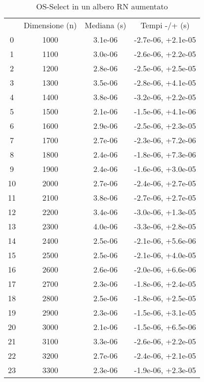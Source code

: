 \begin{table}
\centering
\caption{OS-Select in un albero RN aumentato}
\label{OS-Select in un albero RN aumentato}
\begin{adjustbox}{width=1\textwidth/2}
\begin{tabular}{|c|c|c|c|}
\hline
 & Dimensione (n) & Mediana (s) & Tempi -/+ (s) \\
0 & 1000 & 3.1e-06 & -2.7e-06, +2.1e-05 \\
\cline{1-4}
1 & 1100 & 3.0e-06 & -2.6e-06, +2.2e-05 \\
\cline{1-4}
2 & 1200 & 2.8e-06 & -2.5e-06, +2.5e-05 \\
\cline{1-4}
3 & 1300 & 3.5e-06 & -2.8e-06, +4.1e-05 \\
\cline{1-4}
4 & 1400 & 3.8e-06 & -3.2e-06, +2.2e-05 \\
\cline{1-4}
5 & 1500 & 2.1e-06 & -1.5e-06, +4.1e-06 \\
\cline{1-4}
6 & 1600 & 2.9e-06 & -2.5e-06, +2.3e-05 \\
\cline{1-4}
7 & 1700 & 2.7e-06 & -2.3e-06, +7.2e-06 \\
\cline{1-4}
8 & 1800 & 2.4e-06 & -1.8e-06, +7.3e-06 \\
\cline{1-4}
9 & 1900 & 2.4e-06 & -1.6e-06, +3.0e-05 \\
\cline{1-4}
10 & 2000 & 2.7e-06 & -2.4e-06, +2.7e-05 \\
\cline{1-4}
11 & 2100 & 3.8e-06 & -2.7e-06, +2.7e-05 \\
\cline{1-4}
12 & 2200 & 3.4e-06 & -3.0e-06, +1.3e-05 \\
\cline{1-4}
13 & 2300 & 4.0e-06 & -3.3e-06, +2.8e-05 \\
\cline{1-4}
14 & 2400 & 2.5e-06 & -2.1e-06, +5.6e-06 \\
\cline{1-4}
15 & 2500 & 2.5e-06 & -2.1e-06, +4.0e-05 \\
\cline{1-4}
16 & 2600 & 2.6e-06 & -2.0e-06, +6.6e-06 \\
\cline{1-4}
17 & 2700 & 2.3e-06 & -1.8e-06, +2.4e-05 \\
\cline{1-4}
18 & 2800 & 2.5e-06 & -1.8e-06, +2.5e-05 \\
\cline{1-4}
19 & 2900 & 2.3e-06 & -1.5e-06, +3.1e-05 \\
\cline{1-4}
20 & 3000 & 2.1e-06 & -1.5e-06, +6.5e-06 \\
\cline{1-4}
21 & 3100 & 3.3e-06 & -2.6e-06, +2.2e-05 \\
\cline{1-4}
22 & 3200 & 2.7e-06 & -2.4e-06, +2.1e-05 \\
\cline{1-4}
23 & 3300 & 2.3e-06 & -1.9e-06, +2.3e-05 \\

\end{tabular}
\end{adjustbox}
\end{table}

